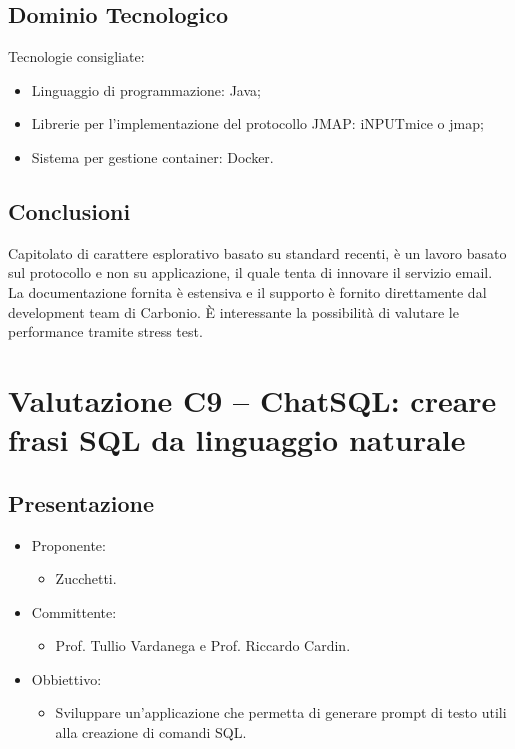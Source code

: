 \documentclass[a4paper, twoside]{article}
\begin{document}
    \subsection{Dominio Tecnologico}
        Tecnologie consigliate:
        \begin{itemize}
            \item Linguaggio di programmazione: Java;
            \item Librerie per l’implementazione del protocollo JMAP: iNPUTmice o jmap;
            \item Sistema per gestione container: Docker.
        \end{itemize}
    \subsection{Conclusioni}
        Capitolato di carattere esplorativo basato su standard recenti, è un lavoro basato sul protocollo e non su applicazione, il quale tenta di innovare il servizio email.
        La documentazione fornita è estensiva e il supporto è fornito direttamente dal development team di Carbonio.
        È interessante la possibilità di valutare le performance tramite stress test.

\section{Valutazione C9 -- ChatSQL: creare frasi SQL da linguaggio naturale}
    \subsection{Presentazione}
        \begin{itemize}
            \item Proponente:
            \begin{itemize}
                \item Zucchetti.
            \end{itemize}
            \item Committente:
            \begin{itemize}
                \item Prof. Tullio Vardanega e Prof.
                Riccardo Cardin.
            \end{itemize}
            \item Obbiettivo:
            \begin{itemize}
                \item Sviluppare un'applicazione che permetta di generare prompt di testo utili alla creazione di comandi SQL.
            \end{itemize}
        \end{itemize}
\end{document}

